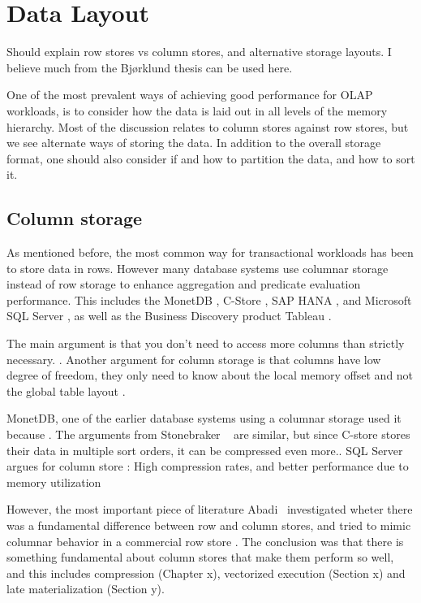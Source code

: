 \chapter{Data Layout}
\label{chap:Data Layout}
\begin{secex}
  Should explain row stores vs column stores, and alternative storage layouts. I believe much from the Bjørklund thesis can be used here.
\end{secex}
One of the most prevalent ways of achieving good performance for OLAP workloads, is to consider how the data is laid out in all levels of the memory hierarchy. Most of the discussion relates to column stores against row stores, but we see alternate ways of storing the data. In addition to the overall storage format, one should also consider if and how to partition the data, and how to sort it.
\newpage

\section{Column storage}
\label{sec:Column storage}
As mentioned before, the most common way for transactional workloads has been to store data in rows. However many database systems use columnar storage instead of row storage to enhance aggregation and predicate evaluation performance. This includes the MonetDB \cite{Boncz2002-yj, Boncz2005-wj}, C-Store \cite{Stonebraker2005-qz}, SAP HANA \cite{Farber2012-vh}, and Microsoft SQL Server \cite{Larson2013-mc, noauthor_undated-vq}, as well as the Business Discovery product Tableau \cite{Kamkolkar2015-iq}. 

The main argument is that you don't need to access more columns than strictly necessary. . Another argument for column storage is that columns have low degree of freedom, they only need to know about the local memory offset and not the global table layout \cite{Boncz2005-wj}.

MonetDB, one of the earlier database systems using a columnar storage used it because  \cite{Boncz2002-yj}. The arguments from Stonebraker \ea~\cite{Stonebraker2005-qz} are similar, but since C-store stores their data in multiple sort orders, it can be compressed even more.. SQL Server argues for column store \cite{noauthor_undated-vq}: High compression rates, and better performance due to memory utilization

However, the most important piece of literature Abadi \ea~investigated wheter there was a fundamental difference between row and column stores, and tried to mimic columnar behavior in a commercial row store \cite{Abadi2008-dd} . The conclusion was that there is something fundamental about column stores that make them perform so well, and this includes compression (Chapter x), vectorized execution (Section x) and late materialization (Section y). 

